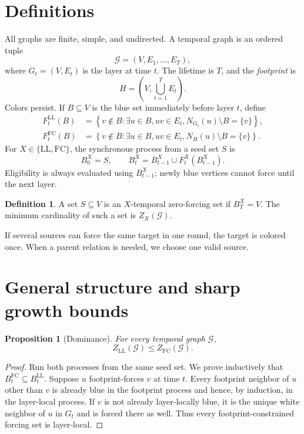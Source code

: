 \documentclass[11pt]{article}
\newtheorem{proposition}[theorem]{Proposition}
\theoremstyle{definition}
\newtheorem{definition}[theorem]{Definition}
\theoremstyle{remark}
\newcommand{\calG}{\mathcal{G}}
\newcommand{\LL}{\mathrm{LL}}
\newcommand{\FC}{\mathrm{FC}}
\begin{document}
\section{Definitions}

All graphs are finite, simple, and undirected.  A temporal graph is an ordered
tuple
\[
  \calG=(V,E_1,\ldots,E_T),
\]
where $G_t=(V,E_t)$ is the layer at time $t$.  The lifetime is $T$, and the
\emph{footprint} is
\[
  H=\left(V,\bigcup_{t=1}^T E_t\right).
\]
Colors persist.  If $B\subseteq V$ is the blue set immediately before layer
$t$, define
\begin{align*}
F_t^{\LL}(B)
 &=\left\{v\notin B:
 \exists u\in B, uv\in E_t,
 N_{G_t}(u)\setminus B=\{v\}\right\},\\
F_t^{\FC}(B)
 &=\left\{v\notin B:
 \exists u\in B, uv\in E_t,
 N_H(u)\setminus B=\{v\}\right\}.
\end{align*}
For $X\in\{\LL,\FC\}$, the synchronous process from a seed set $S$ is
\[
 B_0^X=S,
 \qquad B_t^X=B_{t-1}^X\cup F_t^X(B_{t-1}^X).
\]
Eligibility is always evaluated using $B_{t-1}^X$; newly blue vertices cannot
force until the next layer.

\begin{definition}
A set $S\subseteq V$ is an $X$-temporal zero-forcing set if $B_T^X=V$.
The minimum cardinality of such a set is $Z_X(\calG)$.
\end{definition}

If several sources can force the same target in one round, the target is
colored once.  When a parent relation is needed, we choose one valid source.

\section{General structure and sharp growth bounds}

\begin{proposition}[Dominance]\label{prop:dominance}
For every temporal graph $\calG$,
\[
 Z_{\LL}(\calG)\le Z_{\FC}(\calG).
\]
\end{proposition}

\begin{proof}
Run both processes from the same seed set.  We prove inductively that
$B_t^{\FC}\subseteq B_t^{\LL}$.  Suppose $u$ footprint-forces $v$ at time
$t$.  Every footprint neighbor of $u$ other than $v$ is already blue in the
footprint process and hence, by induction, in the layer-local process.  If
$v$ is not already layer-locally blue, it is the unique white neighbor of
$u$ in $G_t$ and is forced there as well.  Thus every footprint-constrained
forcing set is layer-local.
\end{proof}
\end{document}
